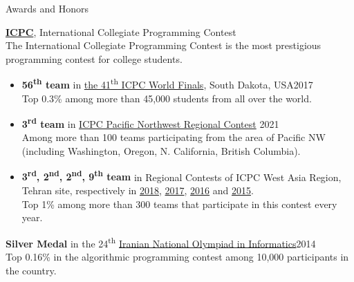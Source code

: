\documentclass{resume} %
\begin{document}
\begin{rSection}{Awards and Honors}
	
	{\bf \href{http://icpc.baylor.edu/}{ICPC}}, International Collegiate Programming Contest
	\\The International Collegiate Programming Contest is the most prestigious programming 
        contest for college students.
	\smallskip
	\vspace{-0.5em}
	\begin{itemize}[leftmargin=3mm]
		\setlength{\itemsep}{1pt}
		\setlength{\parskip}{1pt}
		\setlength{\parsep}{0pt}
		\renewcommand\labelitemi{$\cdot$}

		\item {\bf 56\textsuperscript{th} team} in
		\href{https://icpc.global/community/results-2017}{the 41\textsuperscript{th} 
            ICPC World Finals},
		South Dakota, USA\hfill 2017
		\\ Top 0.3\% among more than 45,000 students from all over the world.
		
		\item {\bf 3\textsuperscript{rd} team} in
            \href{http://www.acmicpc-pacnw.org/scoreboard/2020/index1.html}
            {ICPC Pacific Northwest Regional Contest}
		\hfill 2021
		\\ Among more than 100 teams participating from the area of Pacific NW 
        (including Washington, Oregon, N. California, British Columbia).

		\item {\bf 3\textsuperscript{rd}, 2\textsuperscript{nd}, 2\textsuperscript{nd}, 
            9\textsuperscript{th} team} in Regional Contests of ICPC West Asia Region,
		    Tehran site, respectively in
            \href{http://icpc.sharif.edu/acmicpc18/scoreboard/}{2018},
            \href{http://icpc.sharif.edu/acmicpc17/scoreboard/}{2017},
            \href{http://icpc.sharif.edu/acmicpc16/scoreboard/}{2016} and
            \href{http://icpc.sharif.edu/acmicpc15/scoreboard/}{2015}.
		\\ Top 1\% among more than 300 teams that participate in this contest every year.
	\end{itemize}
	
	{\bf Silver Medal} in the 24\textsuperscript{th} \href{http://inoi.ir/}
        {Iranian National Olympiad in Informatics}\hfill 2014
	\smallskip
	\\Top 0.16\% in the algorithmic programming contest among 10,000 participants 
    in the country.

\end{rSection}
\end{document}
